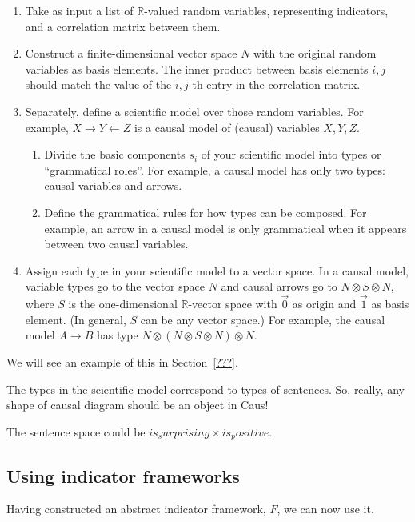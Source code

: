 \documentclass{article}
\theoremstyle{definition}
\begin{document}
\begin{enumerate}
\item Take as input a list of $\mathbb{R}$-valued random variables, representing indicators, and a correlation matrix between them.
\item Construct a finite-dimensional vector space $N$ with the original random variables as basis elements. The inner product between basis elements $i,j$ should match the value of the $i,j$-th entry in the correlation matrix. %
\item Separately, define a scientific model over those random variables. %
For example, $X \to Y \leftarrow Z$ is a causal model of (causal) variables $X, Y, Z$.
	\begin{enumerate}
	\item Divide the basic components $s_i$ of your scientific model into types or ``grammatical roles''. For example, a causal model has only two types: causal variables and arrows. %
	\item Define the grammatical rules for how types can be composed. For example, an arrow in a causal model is only grammatical when it appears between two causal variables.
	\end{enumerate}
\item Assign each type in your scientific model to a vector space. In a causal model, variable types go to the vector space $N$ and causal arrows go to $N \otimes S \otimes N$, where $S$ is the one-dimensional $\mathbb{R}$-vector space with $\vec 0$ as origin and $\vec 1$ as basis element. (In general, $S$ can be any vector space.) For example, the causal model $A \to B$ has type $N \otimes (N \otimes S \otimes N) \otimes N$.
\end{enumerate}

We will see an example of this in Section~\ref{???}.

The types in the scientific model correspond to types of sentences. So, really, any shape of causal diagram should be an object in Caus!

The sentence space could be $is_surprising \times is_positive$.

\subsection{Using indicator frameworks}
Having constructed an abstract indicator framework, $F$, we can now use it.
\end{document}
